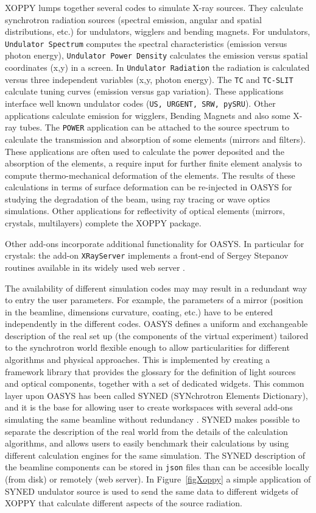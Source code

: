 \documentclass{aip-cp}
\begin{document}
XOPPY lumps together several codes to simulate X-ray sources. They calculate synchrotron radiation sources (spectral emission, angular and spatial distributions, etc.) for undulators, wigglers and bending magnets. For undulators, {\tt Undulator Spectrum} computes the spectral characteristics (emission versus photon energy),  {\tt Undulator Power Density} calculates the emission versus spatial coordinates (x,y) in a screen. In {\tt Undulator Radiation} the radiation is calculated versus three independent variables (x,y, photon energy). The {\tt TC} and {\tt TC-SLIT} calculate tuning curves (emission versus gap variation). These applications interface well known undulator codes ({\tt US, URGENT\cite{urgent}, SRW\cite{srw}, pySRU}). Other applications calculate emission for wigglers, Bending Magnets and also some X-ray tubes. The {\tt POWER} application can be attached to the source spectrum to calculate the transmission and absorption of some elements (mirrors and filters). These applications are often used to calculate the power deposited and the absorption of the elements, a require input for further finite element analysis to compute thermo-mechanical deformation of the elements. The results of these calculations in terms of surface deformation can be re-injected in OASYS for studying the degradation of the beam, using ray tracing or wave optics simulations. Other applications for reflectivity of optical elements (mirrors, crystals, multilayers) complete the XOPPY package. 

Other add-ons incorporate additional functionality for OASYS. In particular for crystals: the add-on {\tt XRayServer} implements a front-end of Sergey Stepanov routines available in its widely used web server \cite{xrayserver}.  

The availability of different simulation codes may may result in a redundant way to entry the user parameters. For example, the parameters of a mirror (position in the beamline, dimensions curvature, coating, etc.) have to be entered independently in the different codes. 
OASYS defines a uniform and exchangeable description of the real set up (the components of the virtual experiment) tailored to the synchrotron world  flexible enough to allow particularities for different algorithms and physical approaches. This is implemented by creating a framework library that provides the glossary for the definition of light sources and optical components, together with a set of dedicated widgets. This common layer upon OASYS has been called SYNED (SYNchrotron Elements Dictionary), and it is the base for allowing user to create workspaces with several add-ons simulating the same beamline without redundancy \cite{oasys2}. SYNED makes possible to  separate the description of the real world from the details of the calculation algorithms, and allows users to easily benchmark their calculations by using different calculation engines for the same simulation. The SYNED description of the beamline components can be stored in {\tt json} files than can be accesible locally (from disk) or remotely (web server). In Figure~\ref{figXoppy} a simple application of SYNED undulator source is used to send the same data to different widgets of XOPPY that calculate different aspects of the source radiation. 
\end{document}
